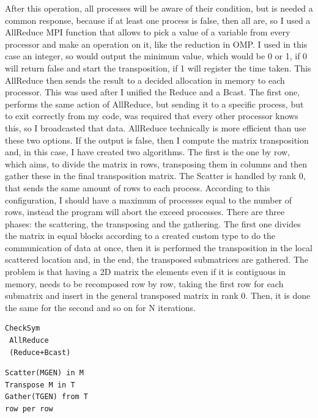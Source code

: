 After this operation, all processes will be aware of their condition, but is needed a common response, because if at least one process is false, then all are, so I used a AllReduce MPI function that allows to pick a value of a variable from every processor and make an operation on it, like the reduction in OMP. I used in this case an integer, so would output the minimum value, which would be 0 or 1, if 0 will return false and start the transposition, if 1 will register the time taken.
This AllReduce then sends the result to a decided allocation in memory to each processor. This was used after I unified the Reduce and a Bcast. The first one, performs the same action of AllReduce, but sending it to a specific process, but to exit correctly from my code, was required that every other processor knows this, so I broadcasted that data. AllReduce technically is more efficient than use these two options.
If the output is false, then I compute the matrix transposition and, in this case, I have created two algorithms. The first is the one by row, which aims, to divide the matrix in rows, transposing them in columns and then gather these in the final transposition matrix. The Scatter is handled by rank 0, that sends the same amount of rows to each process. According to this configuration, I should have a maximum of processes equal to the number of rows, instead the program will abort the exceed processes. There are three phases: the scattering, the transposing and the gathering. The first one divides the matrix in equal blocks according to a created custom type to do the communication of data at once, then it is performed the transposition in the local scattered location and, in the end, the transposed submatrices are gathered.
The problem is that having a 2D matrix the elements even if it is contiguous in memory, needs to be recomposed row by row, taking the first row for each submatrix and insert in the general transposed matrix in rank 0. Then, it is done the same for the second and so on for N iterations. 
\begin{minipage}[!ht]{0.5\columnwidth} 
\begin{lstlisting}[style=Cstyle, caption={Symmetric}]
 CheckSym
 AllReduce
 (Reduce+Bcast)
\end{lstlisting}
\end{minipage}\hfill
\begin{minipage}[!ht]{0.5\columnwidth} 
\begin{lstlisting}[style=Cstyle, caption={Row-Transposition}]
Scatter(MGEN) in M
Transpose M in T
Gather(TGEN) from T
row per row
\end{lstlisting}
\end{minipage}
